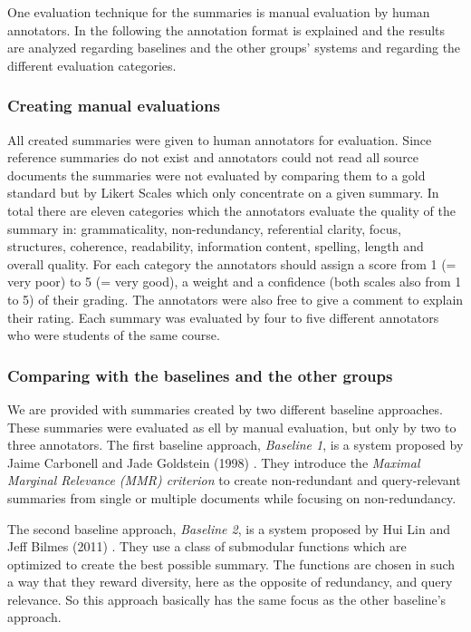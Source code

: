 One evaluation technique for the summaries is manual evaluation by human annotators. In the following the annotation format is explained and the results are analyzed regarding baselines and the other groups' systems and regarding the different evaluation categories.

\subsubsection{Creating manual evaluations}
All created summaries were given to human annotators for evaluation. Since reference summaries do not exist and annotators could not read all source documents the summaries were not evaluated by comparing them to a gold standard but by Likert Scales which only concentrate on a given summary. In total there are eleven categories which the annotators evaluate the quality of the summary in: grammaticality, non-redundancy, referential clarity, focus, structures, coherence, readability, information content, spelling, length and overall quality. For each category the annotators should assign a score from 1 (= very poor) to 5 (= very good), a weight and a confidence (both scales also from 1 to 5) of their grading. The annotators were also free to give a comment to explain their rating. Each summary was evaluated by four to five different annotators who were students of the same course.

\subsubsection{Comparing with the baselines and the other groups}
We are provided with summaries created by two different baseline approaches. These summaries were evaluated as ell by manual evaluation, but only by two to three annotators. The first baseline approach, \textit{Baseline 1}, is a system proposed by Jaime Carbonell and Jade Goldstein (1998) \cite{Carbonell:1998:UMD:290941.291025}. They introduce the \textit{Maximal Marginal Relevance (MMR) criterion} to create non-redundant and query-relevant summaries from single or multiple documents while focusing on non-redundancy.

The second baseline approach, \textit{Baseline 2}, is a system proposed by Hui Lin and Jeff Bilmes (2011) \cite{Lin:2011:CSF:2002472.2002537}. They use a class of submodular functions which are optimized to create the best possible summary. The functions are chosen in such a way that they reward diversity, here as the opposite of redundancy, and query relevance. So this approach basically has the same focus as the other baseline's approach.

